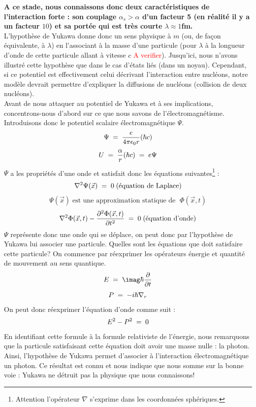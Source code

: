 \textbf{A ce stade, nous connaissons donc deux caractéristiques de l'interaction forte : son couplage $\alpha_s > \alpha$ d'un facteur 5 (en réalité il y a un facteur $10$) et sa portée qui est très courte $\lambda \approx 1$fm.}\\
L'hypothèse de Yukawa donne donc un sens physique à $m$ (ou, de façon équivalente, à $\lambda$) en l'associant à la masse d'une particule (pour $\lambda$ à la longueur d'onde de cette particule allant à vitesse $c$ \textcolor{red}{A verifier}). Jusqu'ici, nous n'avons illustré cette hypothèse que dans le cas d'états liés (dans un noyau). Cependant, si ce potentiel est effectivement celui décrivant l'interaction entre nucléons, notre modèle devrait permettre d'expliquer la diffusions de nucléons (collision de deux nucléons).\\

Avant de nous attaquer au potentiel de Yukawa et à ses implications, concentrons-nous d'abord sur ce que nous savons de l'électromagnétisme. Introduisons donc le potentiel scalaire électromagnétique $\Psi$.
\[
    \Psi \; = \; \dfrac{e}{4\pi \epsilon_0 r}(\hbar c)
\]
\[
    U \; = \;  \dfrac{\alpha}{r}(\hbar c)\; = \; e\Psi 
\]
$\Psi$ a les propriétés d'une onde et satisfait donc les équations suivantes\footnote{Attention l'opérateur $\nabla$ s'exprime dans les coordonnées sphériques.} :
\[
    \nabla^2 \Psi(\Vec{x}) \; = \; 0 \; \text{(équation de Laplace)}
\]
\[
    \Psi(\Vec{x}) \; \text{est une approximation statique de }\; \Phi(\Vec{x},t)
\]
\[
    \nabla^2 \Phi(\Vec{x},t) - \dfrac{\partial^2\Phi(\Vec{x},t)}{ \partial t^2} \; = \; 0 \; \text{(équation d'onde)}
\]
$\Psi$ représente donc une onde qui se déplace, on peut donc par l'hypothèse de Yukawa lui associer une particule. Quelles sont les équations que doit satisfaire cette particule? On commence par réexprimer les opérateurs énergie et quantité de mouvement au sens quantique.
\[
    E \eq\imag\hbar \dfrac{\partial}{\partial t}
\]
\[
    P\; = \; -i\hbar \nabla_r
\]
On peut donc réexprimer l'équation d'onde comme suit :
\[
    E^2 - P^2 \; = \; 0
\]
En identifiant cette formule à la formule relativiste de l'énergie, nous remarquons que la particule satisfaisant cette équation doit avoir une masse nulle : la photon. Ainsi, l'hypothèse de Yukawa permet d'associer à l'interaction électromagnétique un photon. Ce résultat est connu et nous indique que nous somme sur la bonne voie : Yukawa ne détruit pas la physique que nous connaissons!\\

